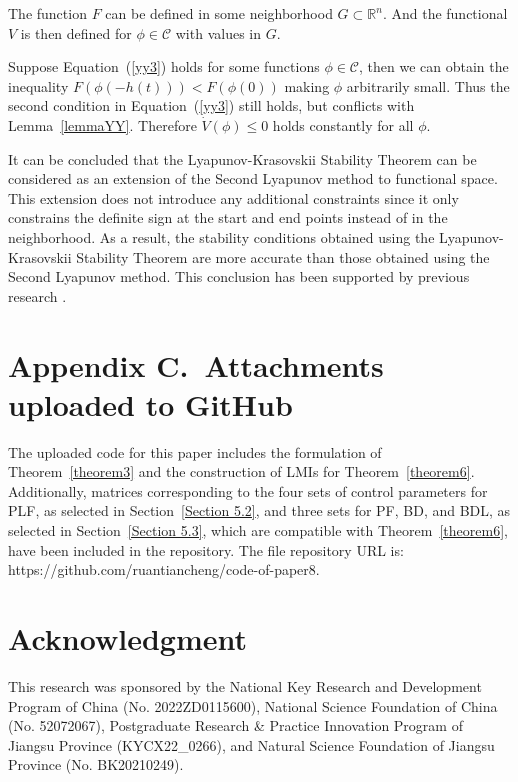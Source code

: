 \documentclass[journal]{IEEEtran}
\begin{document}
The function $F$ can be defined in some neighborhood $G\subset\mathbb{R}^n$. And the functional $V$ is then defined for $\phi\in\mathcal{C}$ with values in $G$.

Suppose Equation~(\ref{yy3}) holds for some functions $\phi\in\mathcal{C}$, then we can obtain the inequality $F\left(\phi\left(-h\left(t\right)\right)\right)<F\left(\phi\left(0\right)\right)$ making $\phi$ arbitrarily small. Thus the second condition in Equation~(\ref{yy3}) still holds, but conflicts with Lemma~\ref{lemmaYY}. Therefore $\dot{V}\left(\phi\right)\le0$ holds constantly for all $\phi$.

It can be concluded that the Lyapunov-Krasovskii Stability Theorem can be considered as an extension of the Second Lyapunov method to functional space. This extension does not introduce any additional constraints since it only constrains the definite sign at the start and end points instead of in the neighborhood. As a result, the stability conditions obtained using the Lyapunov-Krasovskii Stability Theorem are more accurate than those obtained using the Second Lyapunov method. This conclusion has been supported by previous research \citep{wang2016fuzzy,lian2020dissipativity}.


\section*{Appendix C.~Attachments uploaded to GitHub}
\label{AppendixB}
The uploaded code for this paper includes the formulation of Theorem~\ref{theorem3} and the construction of LMIs for Theorem~\ref{theorem6}. Additionally, matrices corresponding to the four sets of control parameters for PLF, as selected in Section~\ref{Section 5.2}, and three sets for PF, BD, and BDL, as selected in Section~\ref{Section 5.3}, which are compatible with Theorem~\ref{theorem6}, have been included in the repository. The file repository URL is: https://github.com/ruantiancheng/code-of-paper8.


\section*{Acknowledgment}


This research was sponsored by the National Key Research and Development Program of China (No. 2022ZD0115600),
 National Science Foundation of China (No. 52072067), Postgraduate Research \& Practice Innovation Program of Jiangsu Province (KYCX22\_0266), and Natural Science Foundation of Jiangsu Province (No. BK20210249).
\end{document}
